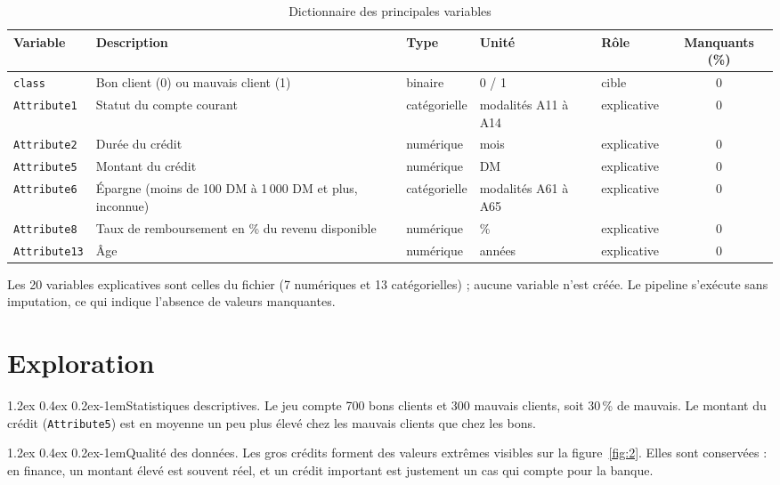 \documentclass[11pt,a4paper]{article}
\makeatletter
\renewcommand\paragraph{\@startsection{paragraph}{4}{\z@}%
  {1.2ex \@plus 0.4ex \@minus 0.2ex}{-1em}{\normalfont\normalsize\bfseries}}
\makeatother
\begin{document}
\begin{table}[htbp]
  \centering
  \caption{Dictionnaire des principales variables}
  \label{tab:dictionnaire}
  \small
  \begin{tabular}{@{}l P{5.6cm} l l l c@{}}
    \toprule
    Variable & Description & Type & Unité & Rôle & Manquants (\%) \\
    \midrule
    \texttt{class} & Bon client (0) ou mauvais client (1) & binaire & 0 / 1 & cible & 0 \\
    \texttt{Attribute1} & Statut du compte courant & catégorielle & modalités A11 à A14 & explicative & 0 \\
    \texttt{Attribute2} & Durée du crédit & numérique & mois & explicative & 0 \\
    \texttt{Attribute5} & Montant du crédit & numérique & DM & explicative & 0 \\
    \texttt{Attribute6} & Épargne (moins de 100 DM à 1\,000 DM et plus, inconnue) & catégorielle & modalités A61 à A65 & explicative & 0 \\
    \texttt{Attribute8} & Taux de remboursement en \% du revenu disponible & numérique & \% & explicative & 0 \\
    \texttt{Attribute13} & Âge & numérique & années & explicative & 0 \\
    \bottomrule
  \end{tabular}
\end{table}
Les 20 variables explicatives sont celles du fichier (7 numériques et 13 catégorielles) ; aucune variable n'est créée. Le pipeline s'exécute sans imputation, ce qui indique l'absence de valeurs manquantes.

\section{Exploration}
\label{sec:exploration}
\paragraph{Statistiques descriptives.} Le jeu compte 700 bons clients et 300 mauvais clients, soit 30\,\% de mauvais. Le montant du crédit (\texttt{Attribute5}) est en moyenne un peu plus élevé chez les mauvais clients que chez les bons.

\paragraph{Qualité des données.} Les gros crédits forment des valeurs extrêmes visibles sur la figure~\ref{fig:2}. Elles sont conservées : en finance, un montant élevé est souvent réel, et un crédit important est justement un cas qui compte pour la banque.
\end{document}
